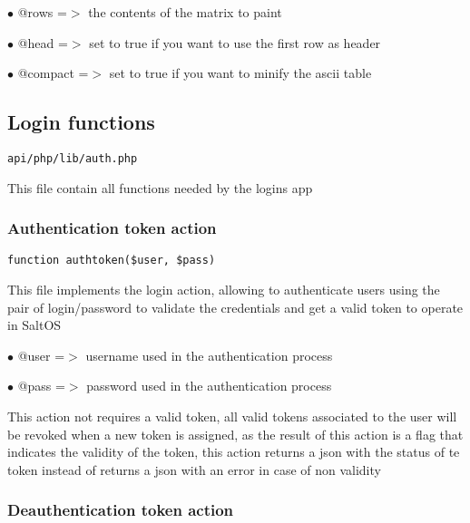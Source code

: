 \documentclass[a4paper]{article}
\begin{document}
\begin{compactitem}
\item[\color{myblue}$\bullet$] @rows    =$>$ the contents of the matrix to paint
\item[\color{myblue}$\bullet$] @head    =$>$ set to true if you want to use the first row as header
\item[\color{myblue}$\bullet$] @compact =$>$ set to true if you want to minify the ascii table
\end{compactitem}

\hypertarget{toc374}{}
\subsection{Login functions}

\begin{lstlisting}
api/php/lib/auth.php
\end{lstlisting}

This file contain all functions needed by the logins app

\hypertarget{toc375}{}
\subsubsection{Authentication token action}

\begin{lstlisting}
function authtoken($user, $pass)
\end{lstlisting}

This file implements the login action, allowing to authenticate users using the pair
of login/password to validate the credentials and get a valid token to operate in SaltOS

\begin{compactitem}
\item[\color{myblue}$\bullet$] @user =$>$ username used in the authentication process
\item[\color{myblue}$\bullet$] @pass =$>$ password used in the authentication process
\end{compactitem}

This action not requires a valid token, all valid tokens associated
to the user will be revoked when a new token is assigned, as the result of this action
is a flag that indicates the validity of the token, this action returns a json with the
status of te token instead of returns a json with an error in case of non validity

\hypertarget{toc376}{}
\subsubsection{Deauthentication token action}
\end{document}
